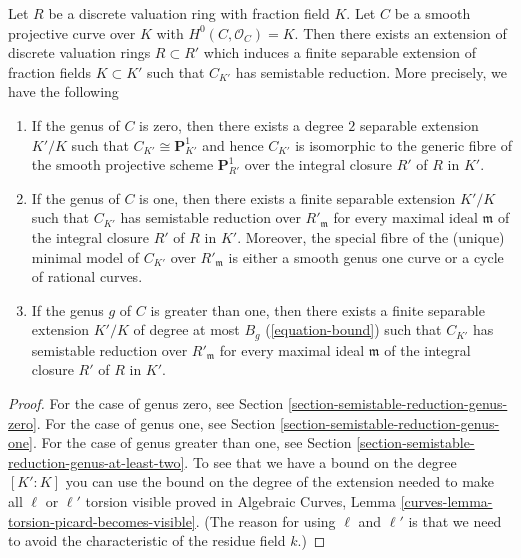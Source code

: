 \begin{theorem}
\label{theorem-semistable-reduction}
\begin{reference}
\cite[Corollary 2.7]{DM}
\end{reference}
Let $R$ be a discrete valuation ring with fraction field $K$. Let $C$ be a
smooth projective curve over $K$ with $H^0(C, \mathcal{O}_C) = K$.
Then there exists an extension of discrete valuation rings
$R \subset R'$ which induces a finite separable extension of
fraction fields $K \subset K'$ such that $C_{K'}$ has semistable reduction.
More precisely, we have the following
\begin{enumerate}
\item If the genus of $C$ is zero, then there exists a degree $2$
separable extension $K'/K$ such that $C_{K'} \cong \mathbf{P}^1_{K'}$
and hence $C_{K'}$ is isomorphic to the generic fibre of the
smooth projective scheme $\mathbf{P}^1_{R'}$ over the integral closure
$R'$ of $R$ in $K'$.
\item If the genus of $C$ is one, then there exists a finite separable
extension $K'/K$ such that $C_{K'}$ has semistable reduction
over $R'_\mathfrak m$ for every maximal ideal $\mathfrak m$
of the integral closure $R'$ of $R$ in $K'$. Moreover, the special
fibre of the (unique) minimal model of $C_{K'}$ over $R'_\mathfrak m$
is either a smooth genus one curve or a cycle of rational curves.
\item If the genus $g$ of $C$ is greater than one, then there exists a
finite separable extension $K'/K$ of degree at most
$B_g$ (\ref{equation-bound}) such that $C_{K'}$ has semistable reduction
over $R'_\mathfrak m$ for every maximal ideal $\mathfrak m$
of the integral closure $R'$ of $R$ in $K'$.
\end{enumerate}
\end{theorem}

\begin{proof}
For the case of genus zero, see
Section \ref{section-semistable-reduction-genus-zero}.
For the case of genus one, see
Section \ref{section-semistable-reduction-genus-one}.
For the case of genus greater than one, see
Section \ref{section-semistable-reduction-genus-at-least-two}.
To see that we have a bound on the degree $[K' : K]$
you can use the bound on the degree of the extension needed
to make all $\ell$ or $\ell'$ torsion visible proved in
Algebraic Curves, Lemma \ref{curves-lemma-torsion-picard-becomes-visible}.
(The reason for using $\ell$ and $\ell'$ is that we need to
avoid the characteristic of the residue field $k$.)
\end{proof}


